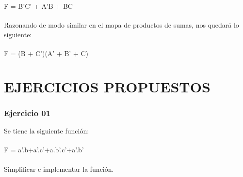 \documentclass{article}
\begin{document}
                F = B’C’ + A’B + BC\\\\
                Razonando de modo similar en el mapa de productos de sumas, nos quedará lo siguiente:\\\\
                F = (B + C’)(A’ + B’ + C)
    \newpage \part{EJERCICIOS PROPUESTOS}
        \section{\textbf{Ejercicio 01}}
            Se tiene la siguiente función:\\\\
            F = a'.b+a'.c'+a.b'.c'+a'.b'\\\\
            Simplificar e implementar la función.\\\\
\end{document}
